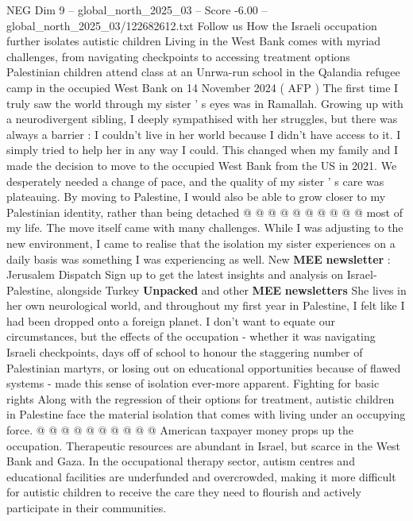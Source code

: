 \begin{textsample}{NEG Dim 9 – global\_north\_2025\_03 – Score -6.00 – global\_north\_2025\_03/122682612.txt}  \label{ex:f9_neg_071}
Follow us How the Israeli occupation further isolates autistic children Living in the West Bank comes with myriad challenges, from navigating checkpoints to accessing treatment options Palestinian children attend class at an Unrwa-run school in the Qalandia refugee camp in the occupied West Bank on 14 November 2024 ( AFP ) The first time I truly saw the world through my sister ' s eyes was in Ramallah.
Growing up with a neurodivergent sibling, I deeply sympathised with her struggles, but there was always a barrier : I couldn't live in her world because I didn't have access to it.
I simply tried to help her in any way I could.
This changed when my family and I made the decision to move to the occupied West Bank from the US in 2021.
We desperately needed a change of pace, and the quality of my sister ' s care was plateauing.
By moving to Palestine, I would also be able to grow closer to my Palestinian identity, rather than being detached @ @ @ @ @ @ @ @ @ @ most of my life.
The move itself came with many challenges.
While I was adjusting to the new environment, I came to realise that the isolation my sister experiences on a daily basis was something I was experiencing as well.
New \textbf{MEE} \textbf{newsletter} : Jerusalem Dispatch Sign up to get the latest insights and analysis on Israel-Palestine, alongside Turkey \textbf{Unpacked} and other \textbf{MEE} \textbf{newsletters} She lives in her own neurological world, and throughout my first year in Palestine, I felt like I had been dropped onto a foreign planet.
I don't want to equate our circumstances, but the effects of the occupation - whether it was navigating Israeli checkpoints, days off of school to honour the staggering number of Palestinian martyrs, or losing out on educational opportunities because of flawed systems - made this sense of isolation ever-more apparent.
Fighting for basic rights Along with the regression of their options for treatment, autistic children in Palestine face the material isolation that comes with living under an occupying force. @ @ @ @ @ @ @ @ @ @ American taxpayer money props up the occupation.
Therapeutic resources are abundant in Israel, but scarce in the West Bank and Gaza.
In the occupational therapy sector, autism centres and educational facilities are underfunded and overcrowded, making it more difficult for autistic children to receive the care they need to flourish and actively participate in their communities.

\end{textsample}
